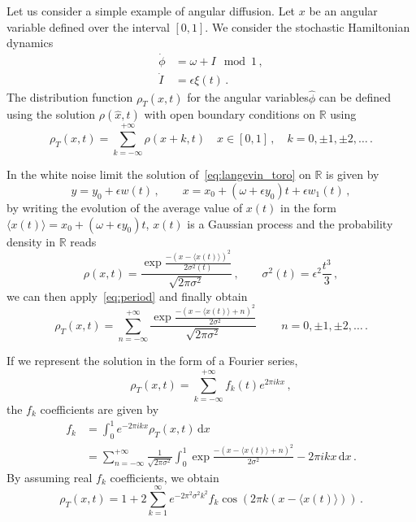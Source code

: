 Let us consider a simple example of angular diffusion. Let \(x\) be an angular variable defined over the interval \([0,1]\). We consider the stochastic Hamiltonian dynamics
\begin{equation}
	\begin{aligned}
		\dot{\phi} &= \omega + I \mod{1}\,, \\
		\dot{I} &= \epsilon\xi(t)	\,.
	\end{aligned}
	\label{eq:langevin_toro}
\end{equation}
The distribution function \(\rho_T(\hat{x},t)\) for the angular variables\(\hat{\phi}\) can be defined using the solution  \(\rho(\hat{x},t)\) with open boundary conditions on \(\mathbb{R}\) using
\begin{equation}
	\rho_T(x,t) = \sum_{k=-\infty}^{+\infty} \rho(x+k,t) \quad x\in[0,1]\,,\quad k = 0,\pm 1, \pm 2, \ldots \,.
 \label{eq:period}
\end{equation}

In the white noise limit the solution of~\eqref{eq:langevin_toro} on \(\mathbb{R}\) is given by
\begin{equation}
	y = y_0 + \epsilon w(t)\,, \qquad x = x_0 + (\omega + \epsilon y_0) t + \epsilon w_1(t) \,,
\end{equation}
by writing the evolution of the average value of \(x(t)\) in the form \(\langle x(t) \rangle = x_0 + (\omega + \epsilon y_0) t\), $x(t)$ is a Gaussian process and the probability density in \(\mathbb{R}\) reads
\begin{equation}
	\rho(x,t) = \frac{\exp{\frac{-(x-\langle x(t)\rangle)^2}{2\sigma^2(t)}}}{\sqrt{2\pi\sigma^2}}\,, \qquad \sigma^2(t) = \epsilon^2 \frac{t^3}{3}\,,
\end{equation}
we can then apply~\eqref{eq:period} and finally obtain
\begin{equation}
	\rho_T(x,t) = \sum_{n=-\infty}^{+\infty} \frac{\exp{\frac{-(x-\langle x(t)\rangle + n)^2}{2\sigma^2}}}{\sqrt{2\pi\sigma^2}} \,\qquad n = 0,\pm 1, \pm 2, \ldots\,.
\end{equation}

If we represent the solution in the form of a Fourier series,
\begin{equation}
	\rho_T(x,t) = \sum_{k=-\infty}^{+\infty} f_k(t)e^{2\pi i k x} \,,
\end{equation}
the \(f_k\) coefficients are given by
\begin{align}
	f_k &= \int_0^1 e^{-2\pi i k x} \rho_T(x,t)\,\mathrm{d}x \\
	&= \sum_{n=-\infty}^{+\infty} \frac{1}{\sqrt{2\pi\sigma^2}} \int_0^1 \exp{\frac{-(x-\langle x(t) \rangle + n)^2}{2\sigma^2} -2\pi i k x}\,\mathrm{d}x \,.
\end{align}
By assuming real \(f_k\) coefficients, we obtain
\begin{equation}
	\rho_T(x,t) = 1+2\sum_{k=1}^\infty e^{-2\pi^2\sigma^2k^2} f_k \cos(2\pi k (x-\langle x(t) \rangle)) \,.
\end{equation}

